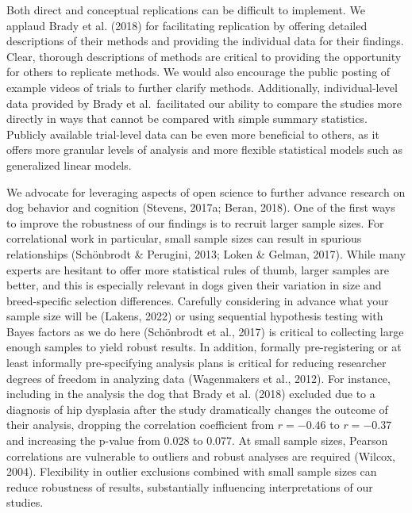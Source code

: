 \documentclass[
  pub,floatsintext]{apa6}
\begin{document}
Both direct and conceptual replications can be difficult to implement. We applaud Brady et al. (2018) for facilitating replication by offering detailed descriptions of their methods and providing the individual data for their findings. Clear, thorough descriptions of methods are critical to providing the opportunity for others to replicate methods. We would also encourage the public posting of example videos of trials to further clarify methods. Additionally, individual-level data provided by Brady et al.~facilitated our ability to compare the studies more directly in ways that cannot be compared with simple summary statistics. Publicly available trial-level data can be even more beneficial to others, as it offers more granular levels of analysis and more flexible statistical models such as generalized linear models.

We advocate for leveraging aspects of open science to further advance research on dog behavior and cognition (Stevens, 2017a; Beran, 2018). One of the first ways to improve the robustness of our findings is to recruit larger sample sizes. For correlational work in particular, small sample sizes can result in spurious relationships (Schönbrodt \& Perugini, 2013; Loken \& Gelman, 2017). While many experts are hesitant to offer more statistical rules of thumb, larger samples are better, and this is especially relevant in dogs given their variation in size and breed-specific selection differences. Carefully considering in advance what your sample size will be (Lakens, 2022) or using sequential hypothesis testing with Bayes factors as we do here (Schönbrodt et al., 2017) is critical to collecting large enough samples to yield robust results. In addition, formally pre-registering or at least informally pre-specifying analysis plans is critical for reducing researcher degrees of freedom in analyzing data (Wagenmakers et al., 2012). For instance, including in the analysis the dog that Brady et al. (2018) excluded due to a diagnosis of hip dysplasia after the study dramatically changes the outcome of their analysis, dropping the correlation coefficient from \(r = -0.46\) to \(r = -0.37\) and increasing the p-value from 0.028 to 0.077. At small sample sizes, Pearson correlations are vulnerable to outliers and robust analyses are required (Wilcox, 2004). Flexibility in outlier exclusions combined with small sample sizes can reduce robustness of results, substantially influencing interpretations of our studies.
\end{document}
